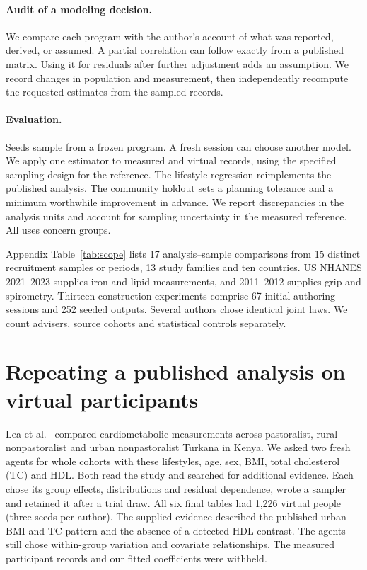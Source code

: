 \documentclass[sigconf,anonymous,review]{acmart}
\begin{document}
\paragraph{Audit of a modeling decision.}
We compare each program with the author's account of what was reported, derived, or assumed. A partial correlation can follow exactly from a published matrix. Using it for residuals after further adjustment adds an assumption. We record changes in population and measurement, then independently recompute the requested estimates from the sampled records.

\paragraph{Evaluation.}
Seeds sample from a frozen program. A fresh session can choose another model. We apply one estimator to measured and virtual records, using the specified sampling design for the reference. The lifestyle regression reimplements the published analysis. The community holdout sets a planning tolerance and a minimum worthwhile improvement in advance. We report discrepancies in the analysis units and account for sampling uncertainty in the measured reference. All uses concern groups.

Appendix Table~\ref{tab:scope} lists 17 analysis--sample comparisons from 15 distinct recruitment samples or periods, 13 study families and ten countries. US NHANES 2021--2023 supplies iron and lipid measurements, and 2011--2012 supplies grip and spirometry. Thirteen construction experiments comprise 67 initial authoring sessions and 252 seeded outputs. Several authors chose identical joint laws. We count advisers, source cohorts and statistical controls separately.

\section{Repeating a published analysis on virtual participants}
\label{sec:lifestyle}
Lea et al.~\cite{lea,leadata} compared cardiometabolic measurements across pastoralist, rural nonpastoralist and urban nonpastoralist Turkana in Kenya. We asked two fresh agents for whole cohorts with these lifestyles, age, sex, BMI, total cholesterol (TC) and HDL. Both read the study and searched for additional evidence. Each chose its group effects, distributions and residual dependence, wrote a sampler and retained it after a trial draw. All six final tables had 1,226 virtual people (three seeds per author). The supplied evidence described the published urban BMI and TC pattern and the absence of a detected HDL contrast. The agents still chose within-group variation and covariate relationships. The measured participant records and our fitted coefficients were withheld.
\end{document}
